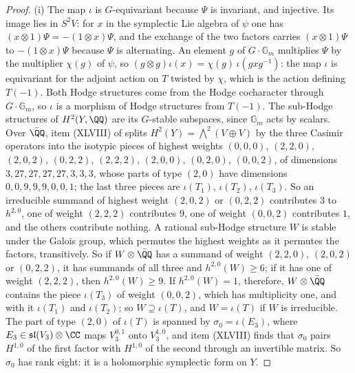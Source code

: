 \begin{proof}
(i) The map $\iota$ is $G$-equivariant because $\Psi$ is invariant, and
injective. Its image lies in $S^{2}V$: for $x$ in the symplectic Lie algebra
of $\psi$ one has $(x\otimes1)\Psi=-(1\otimes x)\Psi$, and the exchange of the
two factors carries $(x\otimes1)\Psi$ to $-(1\otimes x)\Psi$ because $\Psi$
is alternating. An element $g$ of $G\cdot\mathbb{G}_{m}$ multiplies $\Psi$ by
the multiplier $\chi(g)$ of $\psi$, so $(g\otimes g)\iota(x)=
\chi(g)\,\iota(gxg^{-1})$: the map $\iota$ is equivariant for the adjoint
action on $T$ twisted by $\chi$, which is the action defining $T(-1)$. Both
Hodge structures come from the Hodge cocharacter through
$G\cdot\mathbb{G}_{m}$, so $\iota$ is a morphism of Hodge structures from
$T(-1)$. The sub-Hodge structures
of $H^{2}(Y,\QQ)$ are its $G$-stable subspaces, since $\mathbb{G}_{m}$ acts
by scalars. Over $\bar{\QQ}$, item (XLVIII) of  splits
$H^{2}(Y)=\bigwedge^{2}(V\oplus V)$ by the three Casimir operators into the
isotypic pieces of highest weights $(0,0,0)$, $(2,2,0)$, $(2,0,2)$,
$(0,2,2)$, $(2,2,2)$, $(2,0,0)$, $(0,2,0)$, $(0,0,2)$, of dimensions
$3,27,27,27,27,3,3,3$, whose parts of type $(2,0)$ have dimensions
$0,0,9,9,9,0,0,1$; the last three pieces are $\iota(T_{1})$, $\iota(T_{2})$,
$\iota(T_{3})$. So an irreducible summand of highest weight $(2,0,2)$ or
$(0,2,2)$ contributes $3$ to $h^{2,0}$, one of weight $(2,2,2)$ contributes
$9$, one of weight $(0,0,2)$ contributes $1$, and the others contribute
nothing. A rational sub-Hodge structure $W$ is stable under the Galois group,
which permutes the highest weights as it permutes the factors, transitively.
So if $W\otimes\bar{\QQ}$ has a summand of weight $(2,2,0)$, $(2,0,2)$ or
$(0,2,2)$, it has summands of all three and $h^{2,0}(W)\ge6$; if it has one of
weight $(2,2,2)$, then $h^{2,0}(W)\ge9$. If $h^{2,0}(W)=1$, therefore,
$W\otimes\bar{\QQ}$ contains the piece $\iota(T_{3})$ of weight $(0,0,2)$,
which has multiplicity one, and with it $\iota(T_{1})$ and $\iota(T_{2})$; so
$W\supseteq\iota(T)$, and $W=\iota(T)$ if $W$ is irreducible. The
part of type $(2,0)$ of $\iota(T)$ is spanned by $\sigma_{0}=\iota(E_{3})$,
where $E_{3}\in\mathfrak{sl}(V_{3})\otimes\CC$ maps $V_{3}^{0,1}$ onto
$V_{3}^{1,0}$, and item (XLVIII) finds that $\sigma_{0}$ pairs $H^{1,0}$ of the
first factor with $H^{1,0}$ of the second through an invertible matrix. So
$\sigma_{0}$ has rank eight: it is a holomorphic symplectic form on $Y$.


\end{proof}
